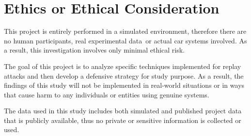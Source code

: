 \documentclass[a4paper,man,12pt]{article}
\begin{document}






\pagebreak


\section{Ethics or Ethical Consideration}

This project is entirely performed in a simulated environment, therefore there are no human participants, real experimental data or actual car systems involved. As a result, this investigation involves only minimal ethical risk. \bigbreak

The goal of this project is to analyze specific techniques implemented for replay attacks and then develop a defensive strategy for study purpose. As a result, the findings of this study will not be implemented in real-world situations or in ways that cause harm to any individuals or entities using genuine systems. \bigbreak

The data used in this study includes both simulated and published project data that is publicly available, thus no private or sensitive information is collected or used.

\pagebreak
\end{document}
